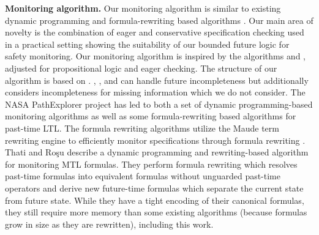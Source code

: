 \vspace*{3pt}
\noindent
\textbf{Monitoring algorithm.}
Our monitoring algorithm is similar to existing dynamic programming and
formula-rewriting based algorithms \cite{Havelund2004,Havelund2002,Rosu2005,Thati2005,Basin2012}.
Our main area of novelty is the combination of eager and conservative specification checking used in a practical setting showing the suitability of our bounded future logic for safety monitoring.
Our monitoring algorithm is inspired by the algorithms \greduce \cite{Garg2011} and
\precis \cite{Chowdhury2014}, adjusted for propositional logic and eager checking.
The structure of our algorithm is based on \greduce.
\greduce, \precis, and \monitor can handle future incompleteness but \greduce additionally
considers incompleteness for missing information which we do not consider.
%
%
The NASA PathExplorer project has led to both a set of dynamic programming-based monitoring algorithms as
well as some formula-rewriting based algorithms \cite{Havelund2004} for past-time LTL.
The formula rewriting algorithms utilize the Maude term rewriting engine to efficiently monitor specifications
through formula rewriting \cite{Rosu2005}.
%
Thati and Ro\c{s}u \cite{Thati2005} describe a dynamic programming and rewriting-based
algorithm for monitoring MTL formulas.
They perform formula rewriting which resolves past-time formulas
into equivalent formulas without unguarded past-time operators and derive new future-time
formulas which separate the current state from future state.
While they have a tight encoding of their canonical formulas, they still require more memory
than some existing algorithms (because formulas
grow in size as they are rewritten), including this work.


